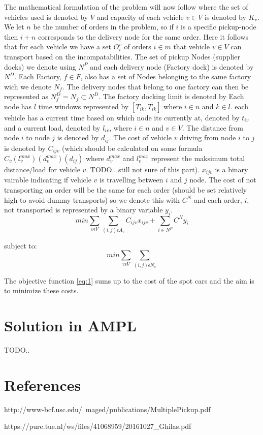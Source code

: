 \documentclass[a4paper,12pt]{article}
\begin{document}
The mathematical formulation of the problem will now follow where the set of vehicles used is denoted by $V$ and capacity of each vehicle $v \in V$ is denoted by $K_v$. We let $n$ be the number of orders in the problem, so if $i$ is a specific pickup-node then $i+n$ corresponds to the delivery node for the same order. Here it follows that for each vehicle we have a set $O_i^v$ of orders $i \in m$ that vehicle $v \in V$ can transport based on the incompatabilities. The set of pickup Nodes (supplier docks) we denote using $N^P$ and each delivery node (Factory dock) is denoted by $N^D$. Each Factory, $f \in F$, also has a set of Nodes belonging to the same factory wich we denote $N_f$. The delivery nodes that belong to one factory can then be represented as $N_f^D = N_f \subset N^D$. The factory docking limit is denoted by  Each node has $l$ time windows represented by $[ \underline{T_{ik}},  \overline{T_{ik}} ]$ where $i \in n$ and $k \in l$. each vehicle has a current time based on which node its currently at, denoted by $t_{iv}$ and a current load, denoted by $l_{iv}$, where $i \in n$ and $v \in V$. The distance from node $i$ to node $j$ is denoted by $d_{ij}$. The cost of vehicle $v$ driving from node $i$ to $j$ is denoted by $C_{ijv}$  (which should be calculated on some formula $C_v(l^{max}_{v})(d^{max}_{v})(d_{ij})$ where $d^{max}_{v}$ and $l^{max}_{v}$ represent the maksimum total distance/load for vehicle $v$. TODO.. still not sure of this part). $x_{ijv}$ is a binary vairable indicating if vehicle $v$ is travelling between $i$ and $j$ node. The cost of not transporting an order will be the same for each order (should be set relatively high to avoid dummy transports) so we denote this with $C^N$ and each order, $i$,  not transported is represented by a binary variable $y_i$. 
\begin{equation} \label{eq:1}
min\sum_{v\epsilon V} \sum_{(i,j)\epsilon A_v} C_{ijv}x_{ijv} + \sum_{i\in N^P}C^Ny_i
\end{equation}

subject to:
\begin{equation}
min\sum_{v\epsilon V}\sum_{(i,j)\epsilon N_v}
\end{equation}



\par
The objective function \ref{eq:1} sums up to the cost of the spot cars and the aim is to minimize these costs.


\section{Solution in AMPL}
TODO..

\section{References}


http://www-bcf.usc.edu/~maged/publications/MultiplePickup.pdf

https://pure.tue.nl/ws/files/41068959/20161027_Ghilas.pdf
\end{document}
